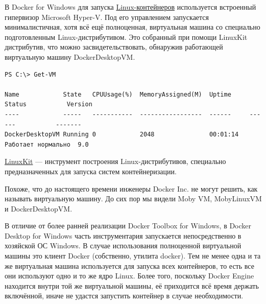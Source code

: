 \documentclass[14pt, a4paper]{article}
\begin{document}
В Docker for Windows для запуска \href{https://docs.microsoft.com/en-us/virtualization/windowscontainers/deploy-containers/linux-containers}{Linux-контейнеров} используется встроенный гипервизор Microsoft
Hyper-V. Под его управлением запускается минималистичная, хотя всё ещё полноценная, виртуальная
машина со специально подготовленным Linux-дистрибутивом. Это собранный при помощи LinuxKit
дистрибутив, что можно засвидетельствовать, обнаружив работающей виртуальную машину
DockerDesktopVM.

\begin{lstlisting}[basicstyle=\fontsize{8}{13}\selectfont\ttfamily, numberstyle=\color{152, 104, 1}]
PS C:\> Get-VM

Name            State   CPUUsage(%)  MemoryAssigned(M)  Uptime     Status           Version
----            -----   -----------  -----------------  ------     ------           -------
DockerDesktopVM Running 0            2048               00:01:14   Работает нормально  9.0

\end{lstlisting}

\href{https://github.com/linuxkit/linuxkit}{LinuxKit} — инструмент построения Linux-дистрибутивов, специально предназначенных для запуска
систем контейнеризации.

Похоже, что до настоящего времени инженеры Docker Inc. не могут решить, как называть виртуальную
машину. До сих пор мы видели Moby VM, MobyLinuxVM и DockerDesktopVM.

В отличие от более ранней реализации Docker Toolbox for Windows, в Docker Desktop for Windows
часть инструментария запускается непосредственно в хозяйской ОС Windows. В случае
использования полноценной виртуальной машины это клиент Docker (собственно, утилита docker).
Тем не менее одна и та же виртуальная машина используется для запуска всех контейнеров, то есть
все они используют одно и то же ядро Linux. Более того, поскольку Docker Engine находится внутри
той же виртуальной машины, её приходится всё время держать включённой, иначе не удастся
запустить контейнер в случае необходимости.
\end{document}
